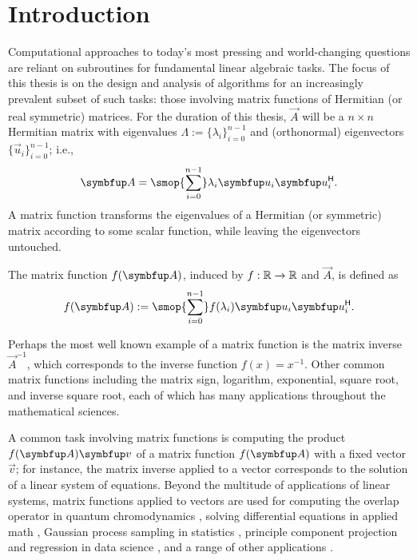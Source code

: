 \chapter{Introduction}
\label{chap:intro}


Computational approaches to today's most pressing and world-changing questions are reliant on subroutines for fundamental linear algebraic tasks.
The focus of this thesis is on the design and analysis of algorithms for an increasingly prevalent subset of such tasks: those involving matrix functions of Hermitian (or real symmetric) matrices.
For the duration of this thesis, \( \vec{A} \) will be a \( n\times n \) Hermitian matrix with eigenvalues \( \Lambda := \{ \lambda_i \}_{i=0}^{n-1} \) and (orthonormal) eigenvectors \( \{ \vec{u}_i\}_{i=0}^{n-1} \); i.e.,
\begin{equation}
    \label{eqn:A}
    \vec{A} = \smop{\sum_{i=0}^{n-1}} \lambda_i \vec{u}_i \vec{u}_i^\cT.
\end{equation}
A matrix function transforms the eigenvalues of a Hermitian (or symmetric) matrix according to some scalar function, while leaving the eigenvectors untouched.
\begin{definition}
\label{def:fA}
The matrix function \( \fA \), induced by \( f:\mathbb{R}\to\mathbb{R} \) and \( \vec{A} \), is defined as 
\begin{equation*}
    \fA := \smop{\sum_{i=0}^{n-1}} f(\lambda_i) \vec{u}_i \vec{u}_i^\cT.
\end{equation*}
   
\end{definition}
Perhaps the most well known example of a matrix function is the matrix inverse \( \vec{A}^{-1} \), which corresponds to the inverse function \( f(x) = x^{-1} \). 
Other common matrix functions including the matrix sign, logarithm, exponential, square root, and inverse square root, each of which has many applications throughout the mathematical sciences.

A common task involving matrix functions is computing the product \( \fA \vec{v} \) of a matrix function \( \fA \) with a fixed vector \( \vec{v} \); for instance, the matrix inverse applied to a vector corresponds to the solution of a linear system of equations.
Beyond the multitude of applications of linear systems, matrix functions applied to vectors are used for 
computing the overlap operator in quantum chromodynamics \cite{eshof_frommer_lippert_schilling_van_der_vorst_02}, 
solving differential equations in applied math \cite{saad_92,hochbruck_lubich_97}, 
Gaussian process sampling in statistics \cite{pleiss_jankowiak_eriksson_damle_gardner_20},
principle component projection and regression in data science \cite{jin_sidford_19},
and a range of other applications \cite{higham_08}.


